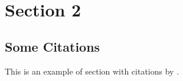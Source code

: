 \documentclass[11pt]{article}
\begin{document}
\blindtext[2] \\


\section{Section 2}

\subsection{Some Citations}

This is an example of section with citations by \citet{McAfee1992-sn} \citep[see][for citation in brackets]{McAfee1992-sn}. \blindtext

\end{document}
